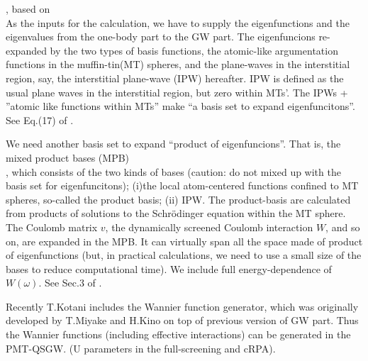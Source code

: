 , based on \cite{kotani_quasiparticle_2014}\\
As the inputs for the \GW calculation,
we have to supply the eigenfunctions and the eigenvalues
from the one-body part to the GW part. 
The eigenfuncions re-expanded by the two types of basis functions,
the atomic-like argumentation functions in the muffin-tin(MT) spheres,
and the plane-waves in the interstitial region, 
say, the interstitial plane-wave (IPW) hereafter.
IPW is defined as the usual plane waves in the interstitial region, 
but zero within MTs'. The IPWs + ''atomic like functions within MTs'' 
make ``a basis set to expand eigenfuncitons''.
See Eq.(17) of \cite{kotani_quasiparticle_2014}.

We need another basis set to expand ``product of eigenfuncions''. 
That is, the mixed product bases (MPB) \\ \cite{Kotani2002,Friedrich2012},
which consists of the two kinds of bases 
(caution: do not mixed up with the basis set for eigenfuncitons);
(i)the local atom-centered functions confined to MT spheres, so-called
the product basis; (ii) IPW. 
The product-basis are calculated from products of
solutions to the Schr\"odinger equation within the MT sphere.
The Coulomb matrix $v$, the dynamically screened 
Coulomb interaction $W$, and so on, are expanded 
in the MPB. It can virtually span all the space made of product of eigenfunctions
(but, in practical calculations, we need to use a small size of the bases
to reduce computational time).
We include full energy-dependence of $W(\omega)$.
See Sec.3 of \cite{kotani_quasiparticle_2014}.

Recently T.Kotani includes the Wannier function generator, 
which was originally developed by T.Miyake and H.Kino on top of 
previous version of GW part. Thus the Wannier functions (including
effective interactions) can be generated in the PMT-QSGW.
(U parameters in the full-screening and cRPA).
\vspace{3mm}


